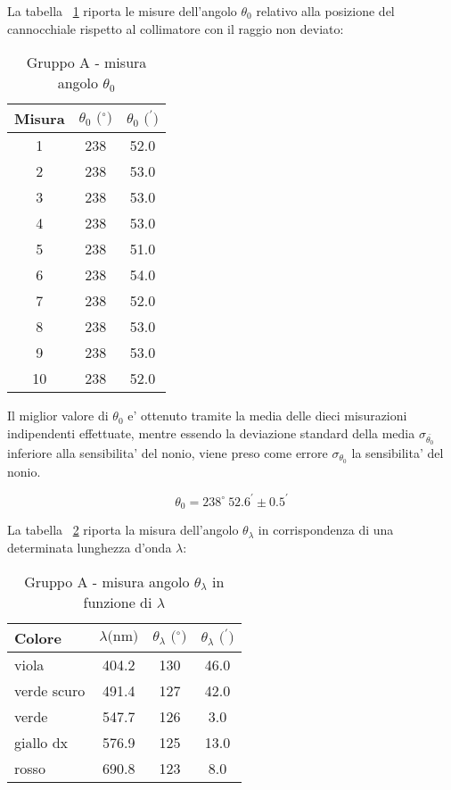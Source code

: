 La tabella ~\ref{table:tbl3} riporta le misure dell'angolo $\theta_0$ relativo alla posizione del cannocchiale rispetto al collimatore con il raggio non deviato:
\begin{table}[!htbp]
    {\par\centering
    \begin{tabular}{ccc}
        \hline
        Misura & $\theta_0 \text{ ($^{\circ}$)}$ & $\theta_0 \text{ ($^{\prime}$)}$ \\
        \hline
        1   &   238 &   52.0\\
        2   &   238 &   53.0\\
        3   &   238 &   53.0\\
        4   &   238 &   53.0\\
        5   &   238 &   51.0\\
        6   &   238 &   54.0\\
        7   &   238 &   52.0\\
        8   &   238 &   53.0\\
        9   &   238 &   53.0\\
        10  &   238 &   52.0\\
        \hline
    \end{tabular}
    \par}
    \caption{Gruppo A - misura angolo $\theta_0$} \label{table:tbl3}
\end{table}

Il miglior valore di $\theta_0$ e' ottenuto tramite la media delle dieci misurazioni indipendenti effettuate, mentre essendo la deviazione standard della media $\sigma_{\bar{\theta_0}}$ inferiore alla sensibilita' del nonio, viene preso come errore $\sigma_{\theta_0}$ la sensibilita' del nonio.

\[
    \theta_0 = 238^{\circ} \ 52.6^{\prime} \pm 0.5^{\prime}
\]

La tabella ~\ref{table:tbl4} riporta la misura dell'angolo $\theta_{\lambda}$ in corrispondenza di una determinata lunghezza d'onda $\lambda$:
\begin{table}[!htbp]
    {\par\centering
    \begin{tabular}{lccc}
        \hline
            Colore &
            $\lambda \text{(nm)}$ &
            $\theta_{\lambda} \text{ ($^{\circ}$)}$ & 
            $\theta_{\lambda} \text{ ($^{\prime}$)}$ \\
        \hline
        viola       &   404.2   &   130 &   46.0\\
        verde scuro &   491.4   &   127 &   42.0\\
        verde       &   547.7   &   126 &   3.0\\
        giallo dx   &   576.9   &   125 &   13.0\\
        rosso       &   690.8   &   123 &   8.0\\
        \hline
    \end{tabular}
    \par}
    \caption{Gruppo A - misura angolo $\theta_{\lambda}$ in funzione di $\lambda$} \label{table:tbl4}
\end{table}

